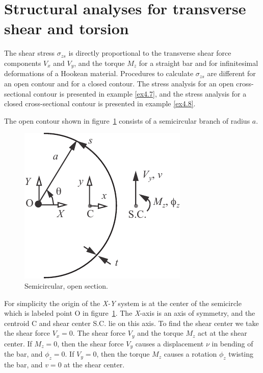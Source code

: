 \documentclass{AeroStructure-ERJohnson}
\begin{document}
\section{Structural analyses for transverse shear and torsion}\label{sec4.4}
The shear stress $\sigma_{z s}$ is directly proportional to the transverse shear force components $V_x$ and ${V}_y$, and the torque ${M}_z$ for a straight bar and for infinitesimal deformations of a Hookean material. Procedures to calculate $\sigma_{z s}$ are different for an open contour and for a closed contour. The stress analysis for an open cross-sectional contour is presented in example \ref{ex4.7}, and the stress analysis for a closed cross-sectional contour is presented in example \ref{ex4.8}.

\enlargethispage{1\baselineskip}

\begin{example*}\setcounter{equation}{0}The open contour shown in figure~\ref{fig4.24} consists of a semicircular branch of radius $a$. \begin{figure}
\vspace{-19pt}
\includegraphics{Figure_4-24.pdf}
\caption{Semicircular, open section.\label{fig4.24}}
\end{figure} For simplicity the origin of the \textit{X-Y} system is at the center of the semicircle which is labeled point O in figure~\ref{fig4.24}. The \textit{X}-axis is an axis of symmetry, and the centroid C and shear center S.C. lie on this axis. To find the shear center we take the shear force $V_{x}=0$. The shear force $V_{y}$ and the torque $M_{z}$ act at the shear center. If $M_{z}=0$, then the shear force ${V}_y$ causes a displacement $\nu$ in bending of the bar, and $\phi_{z}=0$. If $V_{y}=0$, then the torque $M_{z}$ causes a rotation $\phi_{z}$ twisting the bar, and $v=0$ at the shear center.


\end{example*}
\end{document}
